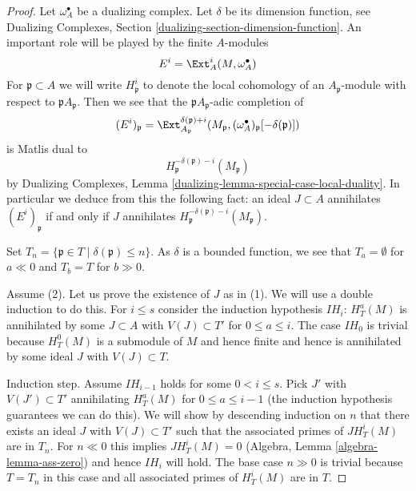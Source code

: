 \begin{proof}
Let $\omega_A^\bullet$ be a dualizing complex. Let $\delta$ be its
dimension function, see Dualizing Complexes, Section
\ref{dualizing-section-dimension-function}.
An important role will be played by the finite $A$-modules
$$
E^i = \Ext_A^i(M, \omega_A^\bullet)
$$
For $\mathfrak p \subset A$ we will write $H^i_\mathfrak p$ to denote the
local cohomology of an $A_\mathfrak p$-module with respect to
$\mathfrak pA_\mathfrak p$. Then we see that
the $\mathfrak pA_\mathfrak p$-adic completion of
$$
(E^i)_\mathfrak p =
\Ext^{\delta(\mathfrak p) + i}_{A_\mathfrak p}(M_\mathfrak p,
(\omega_A^\bullet)_\mathfrak p[-\delta(\mathfrak p)])
$$
is Matlis dual to
$$
H^{-\delta(\mathfrak p) - i}_{\mathfrak p}(M_\mathfrak p)
$$
by
Dualizing Complexes, Lemma \ref{dualizing-lemma-special-case-local-duality}.
In particular we deduce from this the
following fact: an ideal $J \subset A$ annihilates
$(E^i)_\mathfrak p$ if and only if $J$ annihilates
$H^{-\delta(\mathfrak p) - i}_{\mathfrak p}(M_\mathfrak p)$.

\medskip\noindent
Set $T_n = \{\mathfrak p \in T \mid \delta(\mathfrak p) \leq n\}$.
As $\delta$ is a bounded function, we see that
$T_a = \emptyset$ for $a \ll 0$ and $T_b = T$ for $b \gg 0$.

\medskip\noindent
Assume (2). Let us prove the existence of $J$ as in (1).
We will use a double induction to do this. For $i \leq s$
consider the induction hypothesis $IH_i$:
$H^a_T(M)$ is annihilated by some $J \subset A$ with $V(J) \subset T'$
for $0 \leq a \leq i$. The case $IH_0$ is trivial
because $H^0_T(M)$ is a submodule of $M$ and hence finite
and hence is annihilated by some ideal $J$ with $V(J) \subset T$.

\medskip\noindent
Induction step. Assume $IH_{i - 1}$ holds for some $0 < i \leq s$.
Pick $J'$ with $V(J') \subset T'$ annihilating $H^a_T(M)$ for
$0 \leq a \leq i - 1$ (the induction hypothesis guarantees we can
do this). We will show by descending induction on $n$
that there exists an ideal $J$ with $V(J) \subset T'$ such that the
associated primes of $J H^i_T(M)$ are in $T_n$.
For $n \ll 0$ this implies $JH^i_T(M) = 0$ 
(Algebra, Lemma \ref{algebra-lemma-ass-zero})
and hence $IH_i$ will hold.
The base case $n \gg 0$ is trivial because $T = T_n$ in this case
and all associated primes of $H^i_T(M)$ are in $T$.


\end{proof}
